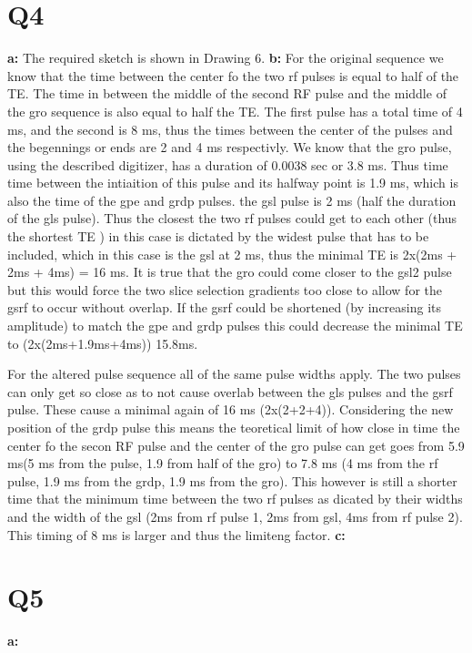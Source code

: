 \documentclass[12pt]{article}
\begin{document}
\section{Q4}
\noindent\textbf{a: }
The required sketch is shown in Drawing 6.
\noindent\textbf{b: }
For the original sequence we know that the time between the center fo the two rf pulses is equal to half of the TE. The time in between the middle of the second RF pulse and the middle of the gro sequence is also equal to half the TE. The first pulse has a total time of 4 ms, and the second is 8 ms, thus the times between the center of the pulses and the begennings or ends are 2 and 4 ms respectivly. We know that the gro pulse, using the described digitizer, has a duration of 0.0038 sec or 3.8 ms. Thus time time between the intiaition of this pulse and its halfway point is 1.9 ms, which is also the time of the gpe and grdp pulses. the gsl pulse is 2 ms (half the duration of the gls pulse). Thus the closest the two rf pulses could get to each other (thus the shortest TE ) in this case is dictated by the widest pulse that has to be included, which in this case is the gsl at 2 ms, thus the minimal TE is 2x(2ms + 2ms + 4ms) = 16 ms. It is true that the gro could come closer to the gsl2 pulse but this would force the two slice selection gradients too close to allow for the gsrf to occur without overlap. If the gsrf could be shortened (by increasing its amplitude) to match the gpe and grdp pulses this could decrease the minimal TE to (2x(2ms+1.9ms+4ms)) 15.8ms.

For the altered pulse sequence all of the same pulse widths apply. The two pulses can only get so close as to not cause overlab between the gls pulses and the gsrf pulse. These cause a minimal again of 16 ms (2x(2+2+4)). Considering the new position of the grdp pulse this means the teoretical limit of how close in time the center fo the secon RF pulse and the center of the gro pulse can get goes from 5.9 ms(5 ms from the pulse, 1.9 from half of the gro) to 7.8 ms (4 ms from the rf pulse, 1.9 ms from the grdp, 1.9 ms from the gro). This however is still a shorter time that the minimum time between the two rf pulses as dicated by their widths and the width of the gsl (2ms from rf pulse 1, 2ms from gsl, 4ms from rf pulse 2). This timing of 8 ms is larger and thus the limiteng factor.
\noindent\textbf{c: }

\section{Q5}
\noindent\textbf{a: }
\end{document}
